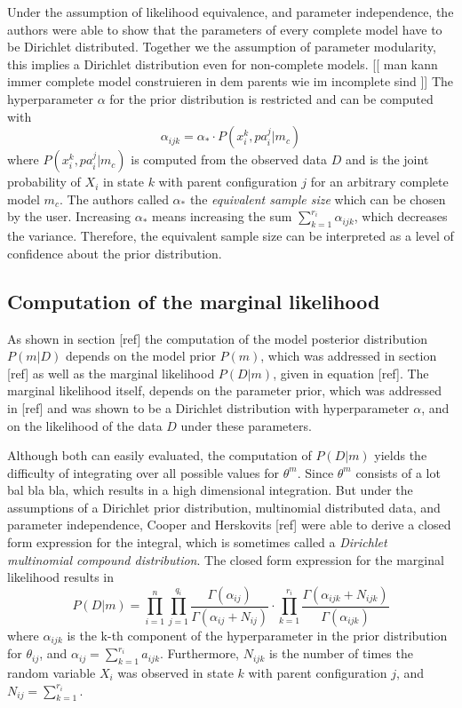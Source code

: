\documentclass{article}
\begin{document}
	Under the assumption of likelihood equivalence, and	parameter independence, the authors were able to
	show that the parameters of every complete model have to be Dirichlet distributed. Together we
	the assumption of parameter modularity, this implies a Dirichlet distribution even for non-complete
	models. [[ man kann immer complete model construieren in dem parents wie im incomplete sind ]]
	The hyperparameter $\alpha$ for the prior distribution is restricted and can be computed with
	\[
		\alpha_{ijk} = \alpha_* \cdot P(x_i^k, pa_i^j|m_c)
	\]
	where $P(x_i^k,pa_i^j|m_c)$ is computed from the observed data $D$ and is the joint probability
	of $X_i$ in state $k$ with parent configuration $j$ for
	an arbitrary complete model $m_c$. The authors called $\alpha_*$
	the \textit{equivalent sample size} which can be chosen by the user. Increasing $\alpha_*$ means
	increasing the sum $\sum_{k=1}^{r_i} \alpha_{ijk}$, which decreases the variance. Therefore, the
	equivalent sample size can be interpreted as a level of confidence about the prior distribution.
	
	\subsection{Computation of the marginal likelihood}
	As shown in section [ref] the computation of the model posterior distribution $P(m|D)$ depends on
	the model prior $P(m)$,	which was addressed in section [ref] as well as the marginal likelihood $P(D|m)$,
	given in equation [ref]. The marginal likelihood itself, depends on the parameter prior, which was
	addressed in [ref] and was shown to be a Dirichlet distribution with hyperparameter $\alpha$, and on
	the likelihood of the data $D$ under these parameters.
	
  Although both can easily evaluated, the computation of $P(D|m)$ yields the difficulty of integrating
  over all possible values for $\theta^m$. Since $\theta^m$ consists of a lot bal bla bla, which results
  in a high dimensional integration. But under the assumptions of a Dirichlet prior distribution,
  multinomial distributed data, and parameter independence, Cooper and Herskovits	[ref] were able
  to derive a closed form expression for the integral, which is sometimes called a
  \textit{Dirichlet multinomial compound distribution}. The closed form expression for the marginal
  likelihood results in
  \[
  	P(D|m)=\prod_{i=1}^n \prod_{j=1}^{q_i} \frac{\Gamma(\alpha_{ij})}{\Gamma(\alpha_{ij}+N_{ij})}
  	\cdot \prod_{k=1}^{r_i} \frac{\Gamma(\alpha_{ijk}+N_{ijk})}{\Gamma(\alpha_{ijk})}
  \]
  where $\alpha_{ijk}$ is the k-th component of the hyperparameter in the prior distribution for
  $\theta_{ij}$, and $\alpha_{ij}=\sum_{k=1}^{r_i}a_{ijk}$. Furthermore, $N_{ijk}$ is the number
  of times the random variable $X_i$ was observed in state $k$ with parent configuration $j$, and
  $N_{ij} = \sum_{k=1}^{r_i}$. 
\end{document}
